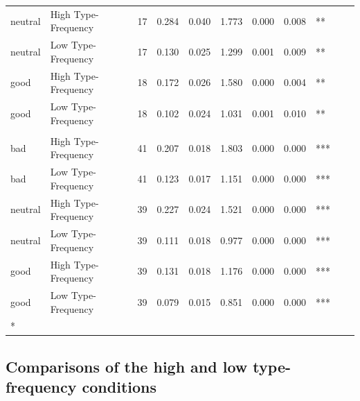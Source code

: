 \documentclass[
]{article}
\begin{document}
\begin{longtable}[t]{llrrrrrrlrr}
\hspace{1em}neutral & High Type-Frequency & 17 & 0.284 & 0.040 & 1.773 & 0.000 & 0.008 & ** &  & \\
\hspace{1em}neutral & Low Type-Frequency & 17 & 0.130 & 0.025 & 1.299 & 0.001 & 0.009 & ** &  & \\
\hspace{1em}good & High Type-Frequency & 18 & 0.172 & 0.026 & 1.580 & 0.000 & 0.004 & ** &  & \\
\hspace{1em}good & Low Type-Frequency & 18 & 0.102 & 0.024 & 1.031 & 0.001 & 0.010 & ** &  & \\
\addlinespace[0.3em]
\multicolumn{11}{l}{\textbf{Prevalence - testable}}\\
\hspace{1em}bad & High Type-Frequency & 41 & 0.207 & 0.018 & 1.803 & 0.000 & 0.000 & *** &  & \\
\hspace{1em}bad & Low Type-Frequency & 41 & 0.123 & 0.017 & 1.151 & 0.000 & 0.000 & *** &  & \\
\hspace{1em}neutral & High Type-Frequency & 39 & 0.227 & 0.024 & 1.521 & 0.000 & 0.000 & *** &  & \\
\hspace{1em}neutral & Low Type-Frequency & 39 & 0.111 & 0.018 & 0.977 & 0.000 & 0.000 & *** &  & \\
\hspace{1em}good & High Type-Frequency & 39 & 0.131 & 0.018 & 1.176 & 0.000 & 0.000 & *** &  & \\
\hspace{1em}good & Low Type-Frequency & 39 & 0.079 & 0.015 & 0.851 & 0.000 & 0.000 & *** &  & \\*
\end{longtable}

\clearpage

\subsection{Comparisons of the high and low type-frequency conditions}\label{comparisons-of-the-high-and-low-type-frequency-conditions-1}
\end{document}
